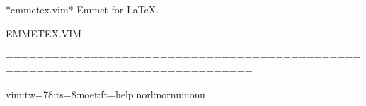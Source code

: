 *emmetex.vim* Emmet for LaTeX.


                                 EMMETEX.VIM


==============================================================================

vim:tw=78:ts=8:noet:ft=help:norl:nornu:nonu
